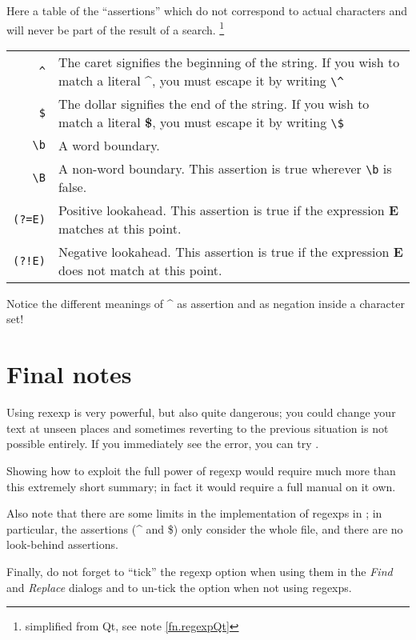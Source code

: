 Here a table of the ``assertions'' which do not correspond to actual characters and will never be part of the result of a search. \footnote{simplified from Qt, see note \ref{fn.regexpQt}}
\smallskip

\noindent\begin{tabular}{Rp{113mm}}
\toprule
\verb|^| & The caret signifies the beginning of the string. If you wish to match a literal \textbf{\^{}}, you must escape it by writing \verb|\^|\\
\verb|$| & The dollar signifies the end of the string. If you wish to match a literal \textbf{\$}, you must escape it by writing \verb|\$|\\  
\verb|\b| & A word boundary.\\
\verb|\B| & A non-word boundary. This assertion is true wherever \verb|\b| is false.\\
\verb|(?=E)| & Positive lookahead. This assertion is true if the expression \textbf{E} matches at this point.\\
\verb|(?!E)| & Negative lookahead. This assertion is true if the expression \textbf{E} does not match at this point.\\
\bottomrule
\end{tabular}
\smallskip

Notice the different meanings of \textbf{\^{}} as assertion and as negation inside a character set!

\section{Final notes}

Using rexexp is very powerful, but also quite dangerous; you could change your text at unseen places and sometimes reverting to the previous situation is not possible entirely. If you immediately see the error, you can try \mbox{}.

Showing how to exploit the full power of regexp would require much more than this extremely short summary; in fact it would require a full manual on it own.

Also note that there are some limits in the implementation of regexps in {\Tw}; in particular, the assertions (\^{} and \$) only consider the whole file, and there are no look-behind assertions.

Finally, do not forget to ``tick'' the regexp option when using them in the \emph{Find} and \emph{Replace} dialogs and to un-tick the option when not using regexps.
